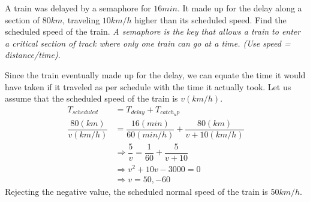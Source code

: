 
%
%
%
%
% 
% 

\question A train was delayed by a semaphore for $16min$. It made up for the delay along a section of $80km$, traveling $10km/h$ higher than its scheduled speed. Find the scheduled speed of the train. \textit{A semaphore is the key that allows a train to enter a critical section of track where only one train can go at a time. (Use speed = distance/time)}.

\insertQR{}

\ifprintanswers
\fi 

\begin{solution}
  Since the train eventually made up for the delay, we can equate the time it would have taken if it traveled as per schedule with the time it actually took. Let us assume that the scheduled speed of the train is $v(km/h)$.
  \begin{align}
    T_{scheduled}           &= T_{delay} + T_{catch_up} \\
    \dfrac{80(km)}{v(km/h)} &= \dfrac{16(min)}{60(min/h)}+\dfrac{80(km)}{v+10(km/h)} \\
    &\Rightarrow \dfrac{5}{v} = \dfrac{1}{60}+\dfrac{5}{v+10} \\
    &\Rightarrow v^2+10v-3000 = 0 \\
    &\Rightarrow v            = 50,-60
  \end{align}
  Rejecting the negative value, the scheduled normal speed of the train is $50km/h$.
\end{solution}

